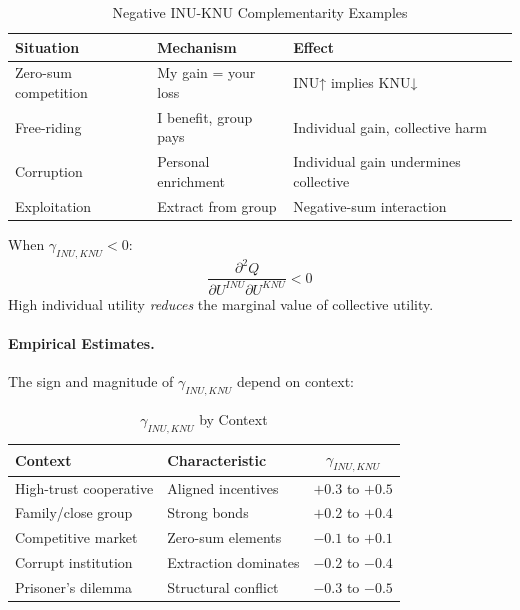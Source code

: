 \begin{table}[htbp]
\centering
\caption{Negative INU-KNU Complementarity Examples}
\label{tab:inu-knu-negative}
\renewcommand{\arraystretch}{1.3}
\begin{tabular}{@{}lll@{}}
\toprule
\textbf{Situation} & \textbf{Mechanism} & \textbf{Effect} \\
\midrule
Zero-sum competition & My gain = your loss & INU↑ implies KNU↓ \\
Free-riding & I benefit, group pays & Individual gain, collective harm \\
Corruption & Personal enrichment & Individual gain undermines collective \\
Exploitation & Extract from group & Negative-sum interaction \\
\bottomrule
\end{tabular}
\end{table}

When $\gamma_{INU,KNU} < 0$:
\begin{equation}
\frac{\partial^2 Q}{\partial U^{INU} \partial U^{KNU}} < 0
\end{equation}
High individual utility \emph{reduces} the marginal value of collective utility.

\paragraph{Empirical Estimates.}
The sign and magnitude of $\gamma_{INU,KNU}$ depend on context:

\begin{table}[htbp]
\centering
\caption{$\gamma_{INU,KNU}$ by Context}
\label{tab:gamma-inu-knu-context}
\renewcommand{\arraystretch}{1.3}
\begin{tabular}{@{}llc@{}}
\toprule
\textbf{Context} & \textbf{Characteristic} & $\gamma_{INU,KNU}$ \\
\midrule
High-trust cooperative & Aligned incentives & $+0.3$ to $+0.5$ \\
Family/close group & Strong bonds & $+0.2$ to $+0.4$ \\
Competitive market & Zero-sum elements & $-0.1$ to $+0.1$ \\
Corrupt institution & Extraction dominates & $-0.2$ to $-0.4$ \\
Prisoner's dilemma & Structural conflict & $-0.3$ to $-0.5$ \\
\bottomrule
\end{tabular}
\end{table}

